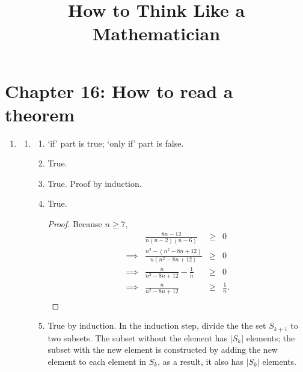 \documentclass{article}
\title{How to Think Like a Mathematician}
\author{}
\date{}
\begin{document}
\maketitle
\section*{Chapter 16: How to read a theorem}
\begin{enumerate}[label=16.\arabic*]
  \item \begin{enumerate}[label=(\roman*)]
          \item \begin{enumerate}[label=(\alph*)]
                  \item `if' part is true; `only if' part is false.
                        \setcounter{enumiii}{2}
                  \item True.
                  \item True. Proof by induction.
                  \item True.
                        \begin{proof}
                          Because $n \ge 7$,
                          \begin{align*}
                                     & \frac{8n-12}{n(n-2)(n-6)}                                  & \ge & 0            \\
                            \implies & \frac{n^2-\left(n^2-8n+12\right)}{n\left(n^2-8n+12\right)} & \ge & 0            \\
                            \implies & \frac{n}{n^2-8n+12} - \frac{1}{n}                          & \ge & 0            \\
                            \implies & \frac{n}{n^2-8n+12}                                        & \ge & \frac{1}{n}. \\
                          \end{align*}
                        \end{proof}
                  \item True by induction. In the induction step, divide the the set $S_{k+1}$
                        to two subsets. The subset without the element has $|S_k|$ elements; the
                        subset with the new element is constructed by adding the new element to each
                        element in $S_k$, as a result, it also has $|S_k|$ elements.
                \end{enumerate}
        \end{enumerate}
\end{enumerate}
\end{document}
